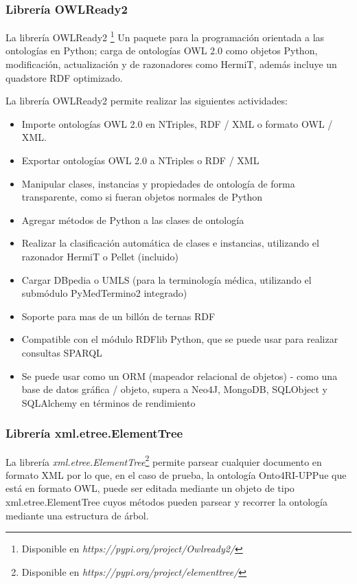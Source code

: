 \subsubsection{Librer\'ia OWLReady2}

La librer\'ia OWLReady2 \footnote{Disponible en \emph{https://pypi.org/project/Owlready2/}} Un paquete para la programaci\'on orientada a las ontolog\'ias en Python; carga de ontolog\'ias OWL 2.0 como objetos Python, modificaci\'on, actualizaci\'on y de razonadores como HermiT, adem\'as incluye un quadstore RDF optimizado.

La librer\'ia OWLReady2 permite realizar las siguientes actividades:

\begin{itemize}
    \item Importe ontolog\'ias OWL 2.0 en NTriples, RDF / XML o formato OWL / XML.
    \item Exportar ontolog\'ias OWL 2.0 a NTriples o RDF / XML
    \item Manipular clases, instancias y propiedades de ontolog\'ia de forma transparente, como si fueran objetos normales de Python
    \item Agregar m\'etodos de Python a las clases de ontolog\'ia
    \item Realizar la clasificaci\'on autom\'atica de clases e instancias, utilizando el razonador HermiT o Pellet (incluido)
    \item Cargar DBpedia o UMLS (para la terminolog\'ia m\'edica, utilizando el subm\'odulo PyMedTermino2 integrado)
    \item Soporte para mas de un bill\'on de ternas RDF
    \item Compatible con el m\'odulo RDFlib Python, que se puede usar para realizar consultas SPARQL
    \item Se puede usar como un ORM (mapeador relacional de objetos) - como una base de datos gr\'afica / objeto, supera a Neo4J, MongoDB, SQLObject y SQLAlchemy en t\'erminos de rendimiento
\end{itemize}

\subsubsection{Librer\'ia xml.etree.ElementTree}

La librer\'ia \textit{xml.etree.ElementTree}\footnote{Disponible en \textit{https://pypi.org/project/elementtree/}} permite parsear cualquier documento en formato XML por lo que, en el caso de prueba, la ontolog\'ia Onto4RI-UPPue que est\'a en formato OWL, puede ser editada mediante un objeto de tipo xml.etree.ElementTree cuyos m\'etodos pueden parsear y recorrer la ontolog\'ia mediante una estructura de \'arbol.\newline


